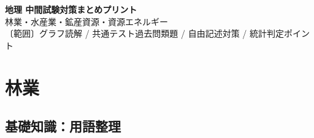 \documentclass[10pt,a4paper,dvipdfmx]{jsarticle}
\begin{document}
\begin{center}
  {\Huge \textbf{地理 中間試験対策まとめプリント}}\\[0.5em]
  {\Large 林業・水産業・鉱産資源・資源エネルギー}\\[0.3em]
  {\small 〔範囲〕グラフ読解 / 共通テスト過去問類題 / 自由記述対策 / 統計判定ポイント}
\end{center}
\vspace{1em}


\section{林業}

\subsection{基礎知識：用語整理}
\end{document}
